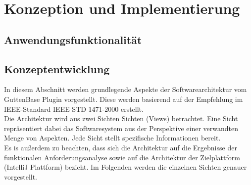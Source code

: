 \chapter{Konzeption und Implementierung}
\section{Anwendungsfunktionalität}
\section{Konzeptentwicklung}
	In diesem Abschnitt werden grundlegende Aspekte der Softwarearchitektur vom GuttenBase Plugin vorgestellt. Diese werden basierend auf der Empfehlung im IEEE-Standard IEEE STD 1471-2000 erstellt.\\
	Die Architektur wird aus zwei Sichten Sichten (Views) betrachtet. Eine Sicht repräsentiert dabei das Softwaresystem aus der Perspektive einer verwandten Menge von Aspekten. Jede Sicht stellt spezifische Informationen bereit.\\
	Es is außerdem zu beachten, dass sich die Architektur auf die Ergebnisse der funktionalen Anforderungsanalyse sowie auf die Architektur der Zielplattform (IntelliJ Plattform) bezieht.
	Im Folgenden werden die einzelnen Sichten genauer vorgestellt.





